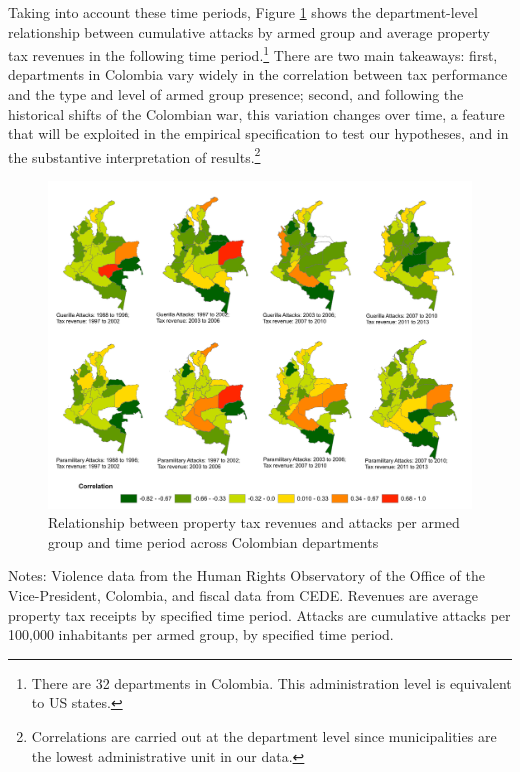 Taking into account these time periods, Figure \ref{chapter3_fig:violence_revenues} shows the department-level relationship between cumulative attacks by armed group and average property tax revenues in the following time period.\footnote{There are 32 departments in Colombia. This administration level is equivalent to US states.} There are two main takeaways: first, departments in Colombia vary widely in the correlation between tax performance and the type and level of armed group presence; second, and following the historical shifts of the Colombian war, this variation changes over time, a feature that will be exploited in the empirical specification to test our hypotheses, and in the substantive interpretation of results.\footnote{Correlations are carried out at the department level since municipalities are the lowest administrative unit in our data.}

\medskip


\begin{figure}[H]
\begin{center}
\caption{Relationship between property tax revenues and attacks per armed group and time period across Colombian departments}
\label{chapter3_fig:violence_revenues}
\includegraphics[width=1\textwidth]{Chapter3/Figures/figure3.pdf}
\end{center}
\end{figure}
Notes: Violence data from the Human Rights Observatory of the Office of the Vice-President, Colombia, and fiscal data from CEDE. Revenues are average property tax receipts by specified time period. Attacks are cumulative attacks per 100,000 inhabitants per armed group, by specified time period. 


